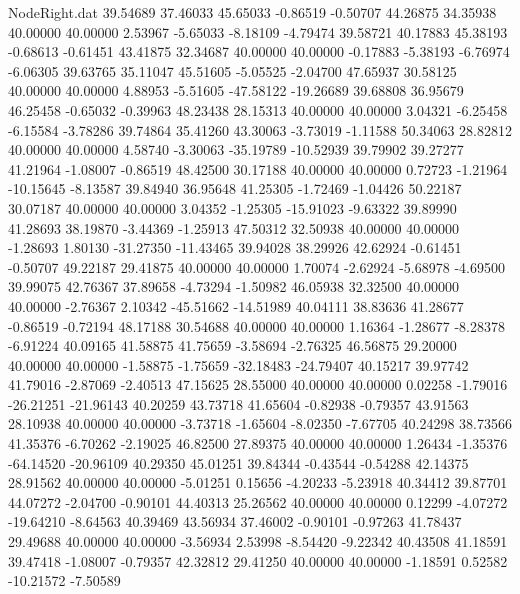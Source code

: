 \begin{filecontents}{NodeRight.dat}
  39.54689   37.46033   45.65033    -0.86519   -0.50707   44.26875   34.35938   40.00000   40.00000    2.53967   -5.65033   -8.18109   -4.79474
  39.58721   40.17883   45.38193    -0.68613   -0.61451   43.41875   32.34687   40.00000   40.00000   -0.17883   -5.38193   -6.76974   -6.06305
  39.63765   35.11047   45.51605    -5.05525   -2.04700   47.65937   30.58125   40.00000   40.00000    4.88953   -5.51605  -47.58122  -19.26689
  39.68808   36.95679   46.25458    -0.65032   -0.39963   48.23438   28.15313   40.00000   40.00000    3.04321   -6.25458   -6.15584   -3.78286
  39.74864   35.41260   43.30063    -3.73019   -1.11588   50.34063   28.82812   40.00000   40.00000    4.58740   -3.30063  -35.19789  -10.52939
  39.79902   39.27277   41.21964    -1.08007   -0.86519   48.42500   30.17188   40.00000   40.00000    0.72723   -1.21964  -10.15645   -8.13587
  39.84940   36.95648   41.25305    -1.72469   -1.04426   50.22187   30.07187   40.00000   40.00000    3.04352   -1.25305  -15.91023   -9.63322
  39.89990   41.28693   38.19870    -3.44369   -1.25913   47.50312   32.50938   40.00000   40.00000   -1.28693    1.80130  -31.27350  -11.43465
  39.94028   38.29926   42.62924    -0.61451   -0.50707   49.22187   29.41875   40.00000   40.00000    1.70074   -2.62924   -5.68978   -4.69500
  39.99075   42.76367   37.89658    -4.73294   -1.50982   46.05938   32.32500   40.00000   40.00000   -2.76367    2.10342  -45.51662  -14.51989
  40.04111   38.83636   41.28677    -0.86519   -0.72194   48.17188   30.54688   40.00000   40.00000    1.16364   -1.28677   -8.28378   -6.91224
  40.09165   41.58875   41.75659    -3.58694   -2.76325   46.56875   29.20000   40.00000   40.00000   -1.58875   -1.75659  -32.18483  -24.79407
  40.15217   39.97742   41.79016    -2.87069   -2.40513   47.15625   28.55000   40.00000   40.00000    0.02258   -1.79016  -26.21251  -21.96143
  40.20259   43.73718   41.65604    -0.82938   -0.79357   43.91563   28.10938   40.00000   40.00000   -3.73718   -1.65604   -8.02350   -7.67705
  40.24298   38.73566   41.35376    -6.70262   -2.19025   46.82500   27.89375   40.00000   40.00000    1.26434   -1.35376  -64.14520  -20.96109
  40.29350   45.01251   39.84344    -0.43544   -0.54288   42.14375   28.91562   40.00000   40.00000   -5.01251    0.15656   -4.20233   -5.23918
  40.34412   39.87701   44.07272    -2.04700   -0.90101   44.40313   25.26562   40.00000   40.00000    0.12299   -4.07272  -19.64210   -8.64563
  40.39469   43.56934   37.46002    -0.90101   -0.97263   41.78437   29.49688   40.00000   40.00000   -3.56934    2.53998   -8.54420   -9.22342
  40.43508   41.18591   39.47418    -1.08007   -0.79357   42.32812   29.41250   40.00000   40.00000   -1.18591    0.52582  -10.21572   -7.50589

\end{filecontents}

